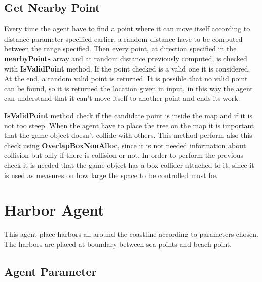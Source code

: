 \documentclass[12pt]{article}
\begin{document}
    \subsection{Get Nearby Point} \label{section:nearbyPoint}
    Every time the agent have to find a point where it can move itself according to distance parameter specified earlier, a random distance have to be computed between the range specified.
    Then every point, at direction specified in the \textbf{nearbyPoints} array and at random distance previously computed, is checked with \textbf{IsValidPoint} method. If the point 
    checked is a valid one it is considered. At the end, a random valid point is returned. It is possible that no valid point can be found, so it is returned the location given in input,
    in this way the agent can understand that it can't move itself to another point and ends its work.
    
    \textbf{IsValidPoint} method check if the candidate point is inside the map and if it is not too steep. When the agent have to place the tree on the map it is important that 
    the game object doesn't collide with others. This method perform also this check using \textbf{OverlapBoxNonAlloc}, since it is not needed information about collision but only
    if there is collision or not. In order to perform the previous check it is needed that the game object has a box collider attached to it, since it is used 
    as measures on how large the space to be controlled must be.
 
    \section{Harbor Agent}
    This agent place harbors all around the coastline according to parameters chosen. The harbors are placed at boundary between sea points and beach point. 
    
    \subsection{Agent Parameter}
\end{document}
